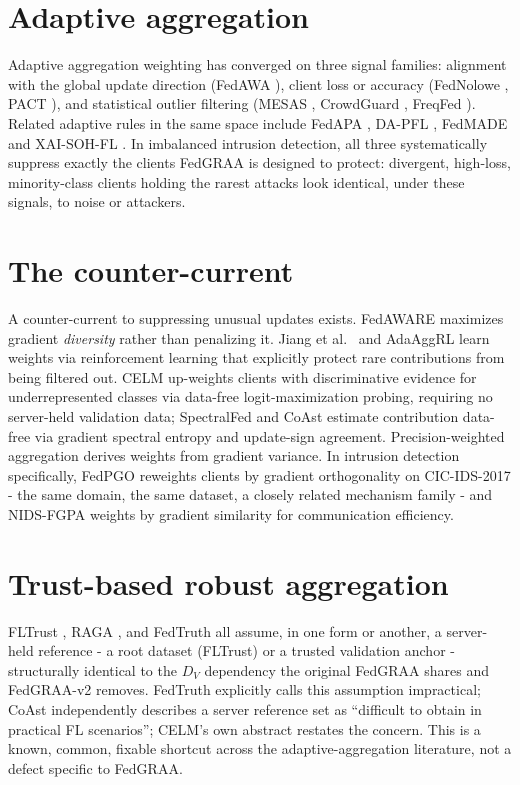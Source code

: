 \documentclass[11pt,a4paper]{report}
\begin{document}
\section{Adaptive aggregation}
\label{sec:adaptive-agg}

Adaptive aggregation weighting has converged on three signal families:
alignment with the global update direction (FedAWA \cite{fedawa}), client
loss or accuracy (FedNolowe \cite{fednolowe}, PACT \cite{pact}), and
statistical outlier filtering (MESAS \cite{mesas}, CrowdGuard
\cite{crowdguard}, FreqFed \cite{freqfed}). Related adaptive rules in the
same space include FedAPA \cite{fedapa}, DA-PFL \cite{dapfl}, FedMADE
\cite{fedmade} and XAI-SOH-FL \cite{xaisohfl}. In imbalanced intrusion
detection, all three systematically suppress exactly the clients FedGRAA is
designed to protect: divergent, high-loss, minority-class clients holding
the rarest attacks look identical, under these signals, to noise or
attackers.

\section{The counter-current}
\label{sec:counter-current}

A counter-current to suppressing unusual updates exists. FedAWARE
\cite{fedaware} maximizes gradient \emph{diversity} rather than penalizing
it. Jiang et al.\ \cite{jiang2024} and AdaAggRL \cite{adaaggrl} learn weights
via reinforcement learning that explicitly protect rare contributions from
being filtered out. CELM \cite{celm} up-weights clients with discriminative
evidence for underrepresented classes via data-free logit-maximization
probing, requiring no server-held validation data; SpectralFed
\cite{spectralfed} and CoAst \cite{coast} estimate contribution data-free via
gradient spectral entropy and update-sign agreement. Precision-weighted
aggregation \cite{reyes2021} derives weights from gradient variance. In
intrusion detection specifically, FedPGO \cite{fedpgo} reweights clients by
gradient orthogonality on CIC-IDS-2017 - the same domain, the same dataset, a
closely related mechanism family - and NIDS-FGPA \cite{nidsfgpa} weights by
gradient similarity for communication efficiency.

\section{Trust-based robust aggregation}
\label{sec:trust-based}

FLTrust \cite{fltrust}, RAGA \cite{raga}, and FedTruth \cite{fedtruth} all
assume, in one form or another, a server-held reference - a root dataset
(FLTrust) or a trusted validation anchor - structurally identical to the
$D_V$ dependency the original FedGRAA shares and FedGRAA-v2 removes. FedTruth
explicitly calls this assumption impractical; CoAst independently describes a
server reference set as ``difficult to obtain in practical FL scenarios'';
CELM's own abstract restates the concern. This is a known, common, fixable
shortcut across the adaptive-aggregation literature, not a defect specific to
FedGRAA.
\end{document}
